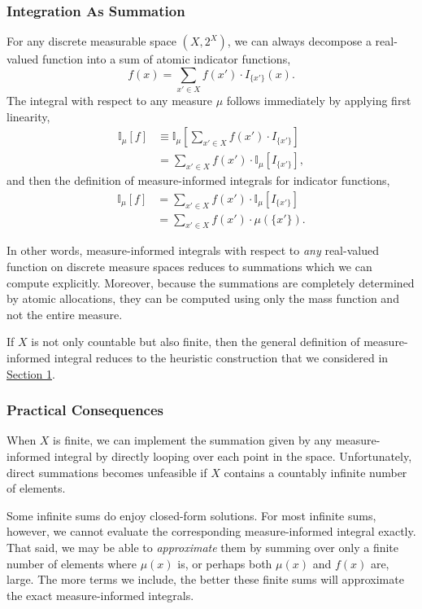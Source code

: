 \documentclass[
  letterpaper,
  DIV=11,
  numbers=noendperiod]{scrartcl}
\begin{document}
\subsubsection{Integration As Summation}\label{integration-as-summation}

For any discrete measurable space \((X, 2^{X})\), we can always
decompose a real-valued function into a sum of atomic indicator
functions, \[
f(x) = \sum_{x' \in X} f(x') \cdot I_{ \{ x' \} }(x).
\] The integral with respect to any measure \(\mu\) follows immediately
by applying first linearity, \begin{align*}
\mathbb{I}_{\mu}[f]
&\equiv
\mathbb{I}_{\mu} \left[ \sum_{x' \in X} f(x') \cdot I_{ \{ x' \} } \right]
\\
&=
\sum_{x' \in X} f(x') \cdot
\mathbb{I}_{\mu} \left[ I_{ \{ x' \} } \right],
\end{align*} and then the definition of measure-informed integrals for
indicator functions, \begin{align*}
\mathbb{I}_{\mu}[f]
&=
\sum_{x' \in X} f(x') \cdot
\mathbb{I}_{\mu} \left[ I_{ \{ x' \} } \right]
\\
&=
\sum_{x' \in X} f(x') \cdot \mu( \{ x' \} ).
\end{align*}

In other words, measure-informed integrals with respect to \emph{any}
real-valued function on discrete measure spaces reduces to summations
which we can compute explicitly. Moreover, because the summations are
completely determined by atomic allocations, they can be computed using
only the mass function and not the entire measure.

If \(X\) is not only countable but also finite, then the general
definition of measure-informed integral reduces to the heuristic
construction that we considered in \hyperref[finite_expectation]{Section
1}.

\subsubsection{Practical Consequences}\label{practical-consequences}

When \(X\) is finite, we can implement the summation given by any
measure-informed integral by directly looping over each point in the
space. Unfortunately, direct summations becomes unfeasible if \(X\)
contains a countably infinite number of elements.

Some infinite sums do enjoy closed-form solutions. For most infinite
sums, however, we cannot evaluate the corresponding measure-informed
integral exactly. That said, we may be able to \emph{approximate} them
by summing over only a finite number of elements where \(\mu(x)\) is, or
perhaps both \(\mu(x)\) and \(f(x)\) are, large. The more terms we
include, the better these finite sums will approximate the exact
measure-informed integrals.
\end{document}
